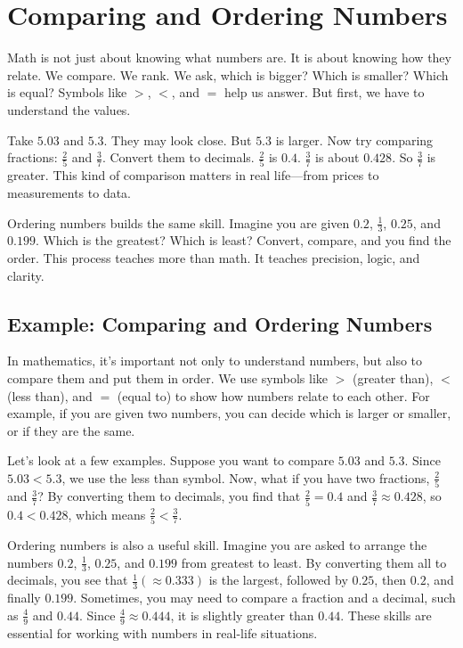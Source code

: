 \cleardoublepage
\section{Comparing and Ordering Numbers}

Math is not just about knowing what numbers are. It is about knowing how they relate. We compare. We rank. We ask, which is bigger? Which is smaller? Which is equal? Symbols like $>$, $<$, and $=$ help us answer. But first, we have to understand the values.

Take $5.03$ and $5.3$. They may look close. But $5.3$ is larger. Now try comparing fractions: $\frac{2}{5}$ and $\frac{3}{7}$. Convert them to decimals. $\frac{2}{5}$ is $0.4$. $\frac{3}{7}$ is about $0.428$. So $\frac{3}{7}$ is greater. This kind of comparison matters in real life—from prices to measurements to data.

Ordering numbers builds the same skill. Imagine you are given $0.2$, $\frac{1}{3}$, $0.25$, and $0.199$. Which is the greatest? Which is least? Convert, compare, and you find the order. This process teaches more than math. It teaches precision, logic, and clarity.


\subsection*{Example: Comparing and Ordering Numbers}

In mathematics, it's important not only to understand numbers, but also to compare them and put them in order. We use symbols like $>$ (greater than), $<$ (less than), and $=$ (equal to) to show how numbers relate to each other. For example, if you are given two numbers, you can decide which is larger or smaller, or if they are the same.

Let's look at a few examples. Suppose you want to compare $5.03$ and $5.3$. Since $5.03 < 5.3$, we use the less than symbol. Now, what if you have two fractions, $\frac{2}{5}$ and $\frac{3}{7}$? By converting them to decimals, you find that $\frac{2}{5} = 0.4$ and $\frac{3}{7} \approx 0.428$, so $0.4 < 0.428$, which means $\frac{2}{5} < \frac{3}{7}$.

Ordering numbers is also a useful skill. Imagine you are asked to arrange the numbers $0.2$, $\frac{1}{3}$, $0.25$, and $0.199$ from greatest to least. By converting them all to decimals, you see that $\frac{1}{3} (\approx 0.333)$ is the largest, followed by $0.25$, then $0.2$, and finally $0.199$. Sometimes, you may need to compare a fraction and a decimal, such as $\frac{4}{9}$ and $0.44$. Since $\frac{4}{9} \approx 0.444$, it is slightly greater than $0.44$. These skills are essential for working with numbers in real-life situations.

